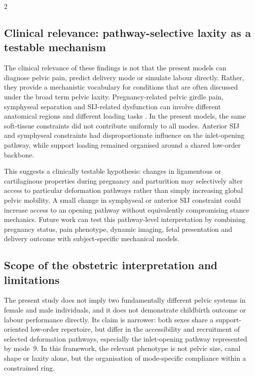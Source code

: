 \documentclass[openacc]{rsproca_new}
\begin{document}
\begin{multicols}{2}
\subsection{Clinical relevance: pathway-selective laxity as a testable mechanism}

The clinical relevance of these findings is not that the present models can diagnose pelvic pain, predict delivery mode or simulate labour directly. Rather, they provide a mechanistic vocabulary for conditions that are often discussed under the broad term pelvic laxity. Pregnancy-related pelvic girdle pain, symphyseal separation and SIJ-related dysfunction can involve different anatomical regions and different loading tasks \cite{Damen2001,Vleeming2012,Kiapour2019,Stolarczyk2021}. In the present models, the same soft-tissue constraints did not contribute uniformly to all modes. Anterior SIJ and symphyseal constraints had disproportionate influence on the inlet-opening pathway, while support loading remained organised around a shared low-order backbone.

This suggests a clinically testable hypothesis: changes in ligamentous or cartilaginous properties during pregnancy and parturition may selectively alter access to particular deformation pathways rather than simply increasing global pelvic mobility. A small change in symphyseal or anterior SIJ constraint could increase access to an opening pathway without equivalently compromising stance mechanics. Future work can test this pathway-level interpretation by combining pregnancy status, pain phenotype, dynamic imaging, fetal presentation and delivery outcome with subject-specific mechanical models.

\subsection{Scope of the obstetric interpretation and limitations}

The present study does not imply two fundamentally different pelvic systems in female and male individuals, and it does not demonstrate childbirth outcome or labour performance directly. Its claim is narrower: both sexes share a support-oriented low-order repertoire, but differ in the accessibility and recruitment of selected deformation pathways, especially the inlet-opening pathway represented by mode~9. In this framework, the relevant phenotype is not pelvic size, canal shape or laxity alone, but the organisation of mode-specific compliance within a constrained ring.


\end{multicols}
\end{document}
